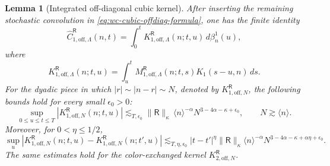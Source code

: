 \documentclass[10pt]{amsart}
\numberwithin{equation}{section}
\theoremstyle{plain}
\newtheorem{lemma}[theorem]{Lemma}
\theoremstyle{definition}
\theoremstyle{remark}
\begin{document}
\begin{lemma}[Integrated off-diagonal cubic kernel]\label{lem:wc-offdiag-cubic-integrated-kernel}
After inserting the remaining stochastic convolution in \eqref{eq:wc-cubic-offdiag-formula}, one has the finite identity
\begin{equation}\label{eq:wc-offdiag-cubic-first-chaos-integrated}
        \widehat C_{1,\mathrm{off},\Lambda}^{\mathsf R}(n,t)
        =\int_0^t K_{1,\mathrm{off},\Lambda}^{\mathsf R}(n;t,u)\,d\beta_n^1(u),
\end{equation}
where
\begin{equation}\label{eq:wc-offdiag-cubic-integrated-kernel}
K_{1,\mathrm{off},\Lambda}^{\mathsf R}(n;t,u)
=\int_u^t M_{1,\mathrm{off},\Lambda}^{\mathsf R}(n;t,s)
        K_1(s-u,n)\,ds.
\end{equation}
For the dyadic piece in which \(|r|\sim |n-r|\sim N\), denoted by \(K_{1,\mathrm{off},N}^{\mathsf R}\), the following bounds hold for every small \(\epsilon_0>0\):
\begin{equation}\label{eq:wc-offdiag-cubic-shell-kernel}
        \sup_{0\le u\le t\le T}
        |K_{1,\mathrm{off},N}^{\mathsf R}(n;t,u)|
        \lesssim_{T,\epsilon_0}
        \|\mathsf R\|_\kappa\,
        \langle n\rangle^{-\alpha}N^{3-4\alpha-\kappa+\epsilon_0},
        \qquad N\gtrsim \langle n\rangle.
\end{equation}
Moreover, for \(0<\eta\le1/2\),
\begin{equation}\label{eq:wc-offdiag-cubic-shell-increment}
        \sup_u
        |K_{1,\mathrm{off},N}^{\mathsf R}(n;t,u)-K_{1,\mathrm{off},N}^{\mathsf R}(n;t',u)|
        \lesssim_{T,\eta,\epsilon_0}
        |t-t'|^\eta\|\mathsf R\|_\kappa
        \langle n\rangle^{-\alpha}N^{3-4\alpha-\kappa+\alpha\eta+\epsilon_0}.
\end{equation}
The same estimates hold for the color-exchanged kernel \(K_{2,\mathrm{off},N}^{\mathsf R}\).
\end{lemma}
\end{document}

